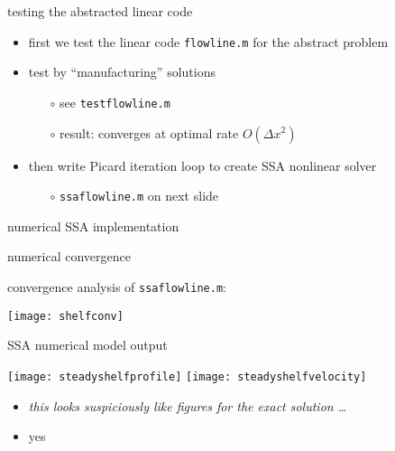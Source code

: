 \begin{frame}{testing the abstracted linear code}

\begin{itemize}
\item first we test the linear code \texttt{flowline.m} for the abstract problem
\item test by ``manufacturing'' solutions
  \begin{itemize}
  \item[$\circ$] see \texttt{testflowline.m}
  \item[$\circ$] result: converges at optimal rate $O(\Delta x^2)$
  \end{itemize}

\bigskip
\item then write Picard iteration loop to create SSA nonlinear solver
  \begin{itemize}
  \item[$\circ$] \texttt{ssaflowline.m} on next slide
  \end{itemize}
\end{itemize}
\end{frame}


\begin{frame}{numerical SSA implementation}

\end{frame}


\begin{frame}{numerical convergence}

convergence analysis of \texttt{ssaflowline.m}:

\begin{center}
  \texttt{[image: shelfconv]}
\end{center}
\end{frame}


\begin{frame}{SSA numerical model output}

\begin{center}
  \texttt{[image: steadyshelfprofile]} \quad
  \texttt{[image: steadyshelfvelocity]}
\end{center}

\bigskip

\begin{itemize}
\item \emph{this looks suspiciously like figures for the exact solution \dots}
\item yes
\end{itemize}
\end{frame}

